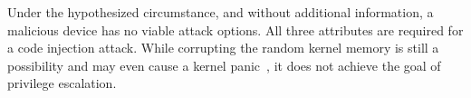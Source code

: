 Under the hypothesized circumstance, and without additional information, a malicious device has no viable attack options.
All three attributes are required for a code injection attack.
While corrupting the random kernel memory is still a possibility and may even cause a kernel panic~\cite{MMT16}, it does not achieve the goal of privilege escalation.
